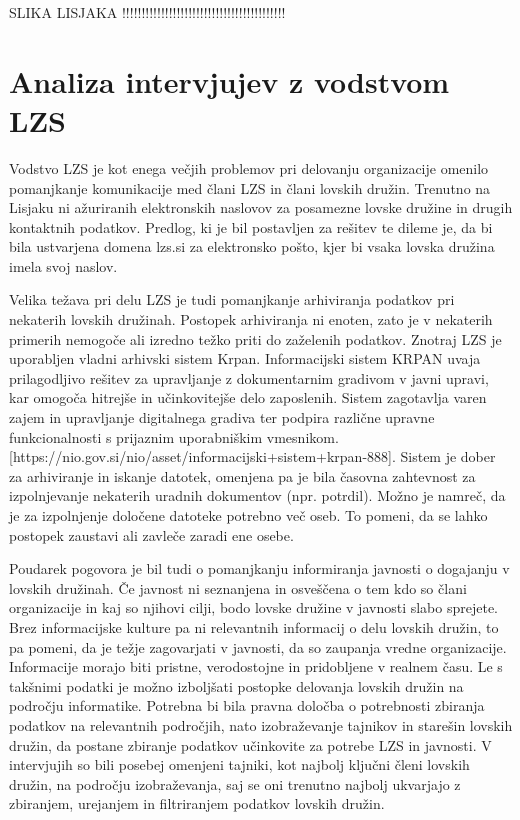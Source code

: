 \documentclass[a4paper,12pt,openright]{book}
\begin{document}
SLIKA LISJAKA !!!!!!!!!!!!!!!!!!!!!!!!!!!!!!!!!!!!!!!!!!

\section{Analiza intervjujev z vodstvom LZS}

Vodstvo LZS je kot enega večjih problemov pri delovanju organizacije omenilo pomanjkanje komunikacije med člani LZS in člani lovskih družin.
Trenutno na Lisjaku ni ažuriranih elektronskih naslovov za posamezne lovske družine in drugih kontaktnih podatkov. 
Predlog, ki je bil postavljen za rešitev te dileme je, da bi bila ustvarjena domena lzs.si za elektronsko pošto, kjer bi vsaka lovska družina imela svoj naslov. 

Velika težava pri delu LZS je tudi pomanjkanje arhiviranja podatkov pri nekaterih lovskih družinah. 
Postopek arhiviranja ni enoten, zato je v nekaterih primerih nemogoče ali izredno težko priti do zaželenih podatkov.
Znotraj LZS je uporabljen vladni arhivski sistem Krpan.
Informacijski sistem KRPAN uvaja prilagodljivo rešitev za upravljanje z dokumentarnim gradivom v javni upravi, kar omogoča hitrejše in učinkovitejše delo zaposlenih. 
Sistem zagotavlja varen zajem in upravljanje digitalnega gradiva ter podpira različne upravne funkcionalnosti s prijaznim uporabniškim vmesnikom.
[https://nio.gov.si/nio/asset/informacijski+sistem+krpan-888]. 
Sistem je dober za arhiviranje in iskanje datotek, omenjena pa je bila časovna zahtevnost za izpolnjevanje nekaterih uradnih dokumentov (npr. potrdil). 
Možno je namreč, da je za izpolnjenje določene datoteke potrebno več oseb. 
To pomeni, da se lahko postopek zaustavi ali zavleče zaradi ene osebe. 

Poudarek pogovora je bil tudi o pomanjkanju informiranja javnosti o dogajanju v lovskih družinah. 
Če javnost ni seznanjena in osveščena o tem kdo so člani organizacije in kaj so njihovi cilji, bodo lovske družine v javnosti slabo sprejete.
Brez informacijske kulture pa ni relevantnih informacij o delu lovskih družin, to pa pomeni, da je težje zagovarjati v javnosti, da so zaupanja vredne organizacije.
Informacije morajo biti pristne, verodostojne in pridobljene v realnem času.
Le s takšnimi podatki je možno izboljšati postopke delovanja lovskih družin na področju informatike.
Potrebna bi bila pravna določba o potrebnosti zbiranja podatkov na relevantnih področjih, nato izobraževanje tajnikov in starešin lovskih družin, da postane zbiranje podatkov učinkovite za potrebe LZS in javnosti.
V intervjujih so bili  posebej omenjeni tajniki, kot najbolj ključni členi lovskih družin, na področju izobraževanja, saj se oni trenutno najbolj ukvarjajo z zbiranjem, urejanjem in filtriranjem podatkov lovskih družin.  
\end{document}
